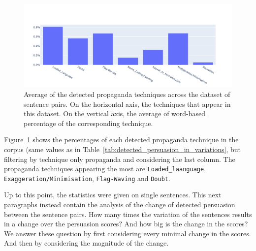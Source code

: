 \begin{figure}[!htbp]
    \centering
    \includegraphics[width=\linewidth]{figures/4.3.1_propaganda_avg.pdf}
    \caption{Average of the detected propaganda techniques across the dataset of sentence pairs. On the horizontal axis, the techniques that appear in this dataset. On the vertical axis, the average of word-based percentage of the corresponding technique.}
    \label{fig:propaganda_avg}
\end{figure}

Figure~\ref{fig:propaganda_avg} shows the percentages of each detected propaganda technique in the corpus (same values as in Table~\ref{tab:detected_persuasion_in_variations}, but filtering by technique only propaganda and considering the last column.
The propaganda techniques appearing the most are \texttt{Loaded\_laanguage}, \texttt{Exaggeration/Minimisation}, \texttt{Flag-Waving} and \texttt{Doubt}.

Up to this point, the statistics were given on single sentences. This next paragraphs instead contain the analysis of the change of detected persuasion between the sentence pairs.
How many times the variation of the sentences results in a change over the persuasion scores? And how big is the change in the scores?
We answer these question by first considering every minimal change in the scores. And then by considering the magnitude of the change.



